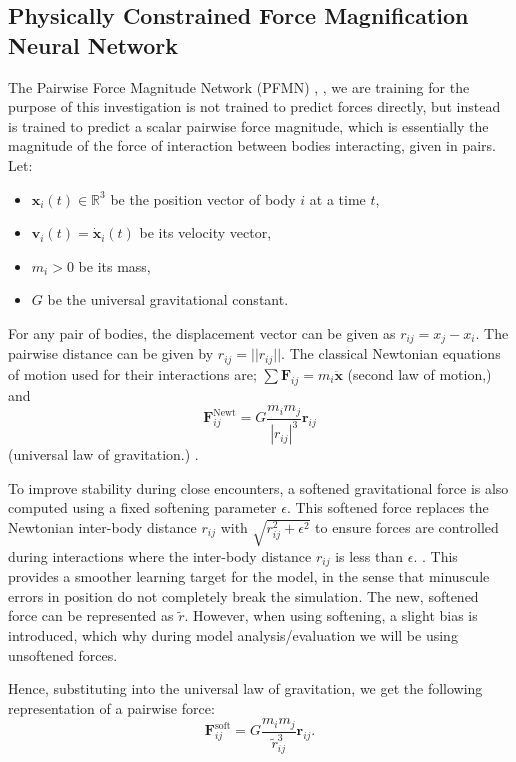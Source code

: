 \documentclass[12pt,a4paper]{article}
\begin{document}
\subsection{Physically Constrained Force Magnification Neural Network}
\label{subsec:pfmn}
The Pairwise Force Magnitude Network (PFMN) \cite{nguyen2021pairwise}, \cite{battaglia2016interaction}, we are training for the purpose of this investigation is not trained to predict forces directly, but instead is trained to predict a scalar pairwise force magnitude, which is essentially the magnitude of the force of interaction between bodies interacting, given in pairs. Let:
\begin{itemize}
    \item \textbf{$\mathbf{x}_i(t) \in \mathbb{R}^3$} be the position vector of body $i$ at a time $t$,
    \item \textbf{$\mathbf{v}_i (t) = \mathbf{\dot x}_i(t)$} be its velocity vector,
    \item \textbf{$m_i > 0$} be its mass,
    \item \textbf{$G$} be the universal gravitational constant.
\end{itemize}

For any pair of bodies, the displacement vector can be given as $r_{ij} = x_j - x_i$. The pairwise distance can be given by $r_{ij} = ||r_{ij}||$. The classical Newtonian equations of motion used for their interactions are; $\sum \mathbf{F}_{ij} = m_i \mathbf{\ddot x}$ (second law of motion,) and $$\mathbf{F}_{ij}^{\text{Newt}} = G \frac{m_i m_j}{|r_{ij}|^3} \mathbf{r}_{ij}$$ (universal law of gravitation.) \cite{murray1999solar}.

To improve stability during close encounters, a softened gravitational force is also computed using a fixed softening parameter $\epsilon$. This softened force replaces the Newtonian inter-body distance $r_{ij}$ with $\sqrt{r^2_{ij} + \epsilon^2}$ to ensure forces are controlled during interactions where the inter-body distance $r_{ij}$ is less than $\epsilon$. \cite{Dehnen2001}. This provides a smoother learning target for the model, in the sense that minuscule errors in position do not completely break the simulation. The new, softened force can be represented as $\tilde{r}$. However, when using softening, a slight bias is introduced, which why during model analysis/evaluation we will be using unsoftened forces.

Hence, substituting into the universal law of gravitation, we get the following representation of a pairwise force:
$$\mathbf{F}_{ij}^{\text{soft}} = G \frac{m_i m_j}{\tilde{r}_{ij}^3} \mathbf{r}_{ij}.$$
\end{document}
